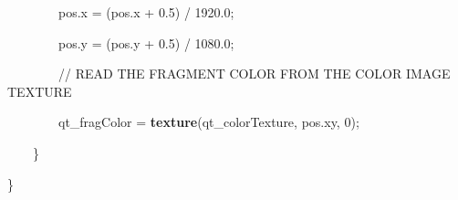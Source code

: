 {\ttfamily
\textcolor[rgb]{0.7529412,0.7529412,0.7529412}{\ \ \ \ \ \ \ \ }pos.x\textcolor[rgb]{0.7529412,0.7529412,0.7529412}{
}=\textcolor[rgb]{0.7529412,0.7529412,0.7529412}{ }(pos.x +
\textcolor[rgb]{0.0,0.0,0.5019608}{0.5}) /
\textcolor[rgb]{0.0,0.0,0.5019608}{1920.0};}

{\ttfamily
\textcolor[rgb]{0.7529412,0.7529412,0.7529412}{\ \ \ \ \ \ \ \ }pos.y\textcolor[rgb]{0.7529412,0.7529412,0.7529412}{
}=\textcolor[rgb]{0.7529412,0.7529412,0.7529412}{ }(pos.y +
\textcolor[rgb]{0.0,0.0,0.5019608}{0.5}) /
\textcolor[rgb]{0.0,0.0,0.5019608}{1080.0};}

{\ttfamily
\textcolor[rgb]{0.7529412,0.7529412,0.7529412}{\ \ \ \ \ \ \ \ }\textcolor[rgb]{0.0,0.5019608,0.0}{//}\textcolor[rgb]{0.7529412,0.7529412,0.7529412}{
}\textcolor[rgb]{0.0,0.5019608,0.0}{READ}\textcolor[rgb]{0.7529412,0.7529412,0.7529412}{
}\textcolor[rgb]{0.0,0.5019608,0.0}{THE}\textcolor[rgb]{0.7529412,0.7529412,0.7529412}{
}\textcolor[rgb]{0.0,0.5019608,0.0}{FRAGMENT}\textcolor[rgb]{0.7529412,0.7529412,0.7529412}{
}\textcolor[rgb]{0.0,0.5019608,0.0}{COLOR}\textcolor[rgb]{0.7529412,0.7529412,0.7529412}{
}\textcolor[rgb]{0.0,0.5019608,0.0}{FROM}\textcolor[rgb]{0.7529412,0.7529412,0.7529412}{
}\textcolor[rgb]{0.0,0.5019608,0.0}{THE}\textcolor[rgb]{0.7529412,0.7529412,0.7529412}{
}\textcolor[rgb]{0.0,0.5019608,0.0}{COLOR}\textcolor[rgb]{0.7529412,0.7529412,0.7529412}{
}\textcolor[rgb]{0.0,0.5019608,0.0}{IMAGE}\textcolor[rgb]{0.7529412,0.7529412,0.7529412}{
}\textcolor[rgb]{0.0,0.5019608,0.0}{TEXTURE}}

{\ttfamily
\textcolor[rgb]{0.7529412,0.7529412,0.7529412}{\ \ \ \ \ \ \ \ }qt\_fragColor\textcolor[rgb]{0.7529412,0.7529412,0.7529412}{
}=\textcolor[rgb]{0.7529412,0.7529412,0.7529412}{
}\textbf{\textcolor[rgb]{0.5019608,0.5019608,0.0}{texture}}(qt\_colorTexture,\textcolor[rgb]{0.7529412,0.7529412,0.7529412}{
}pos.xy,\textcolor[rgb]{0.7529412,0.7529412,0.7529412}{
}\textcolor[rgb]{0.0,0.0,0.5019608}{0});}

{\ttfamily
\textcolor[rgb]{0.7529412,0.7529412,0.7529412}{\ \ \ \ }\}}

{\ttfamily
\}}

